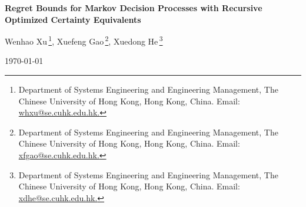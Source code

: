 \documentclass[11pt]{article}
\newcommand{\1}{\mathbbm{1}}
\begin{document}
\begin{center}
		\Large \bf Regret Bounds for Markov Decision Processes with Recursive Optimized Certainty Equivalents

	\end{center}
	\author{}
	\begin{center}
	{Wenhao Xu}\,\footnote{Department of Systems
			Engineering and Engineering Management, The Chinese University of Hong Kong, Hong Kong, China.
			Email: \url{whxu@se.cuhk.edu.hk.} },
		Xuefeng Gao\,\footnote{Department of Systems
			Engineering and Engineering Management, The Chinese University of Hong Kong, Hong Kong, China. Email: \url{xfgao@se.cuhk.edu.hk.}},
        Xuedong He\,\footnote{Department of Systems
			Engineering and Engineering Management, The Chinese University of Hong Kong, Hong Kong, China. Email: \url{xdhe@se.cuhk.edu.hk.}
		}
	\end{center}
	
	\begin{center}
		\today
	\end{center}

\begin{abstract}
The optimized certainty equivalent (OCE) is a family of risk measures that cover important examples such as entropic risk, conditional value-at-risk and mean-variance models. In this paper, we propose a new episodic risk-sensitive reinforcement learning formulation based on tabular Markov decision processes with recursive OCEs. We design an efficient learning algorithm for this problem based on value iteration and upper confidence bound. We derive an upper bound on the regret of the proposed algorithm, and also establish a minimax lower bound. Our bounds show that the regret rate achieved by our proposed algorithm has optimal dependence on the number of episodes and the number of actions. 
\end{abstract}


\end{document}
